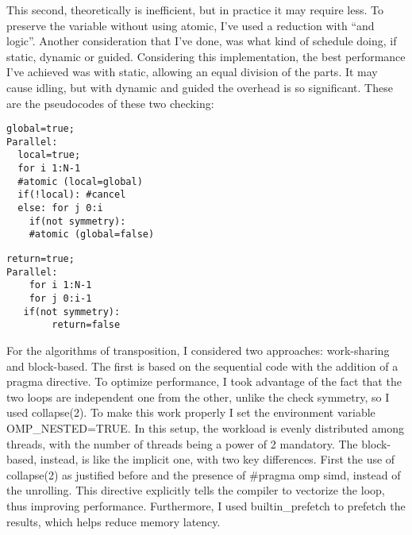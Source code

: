 This second, theoretically is inefficient, but in practice it may require less. To preserve the variable without using atomic, I've used a reduction with “and logic”. Another consideration that I've done, was what kind of schedule doing, if static, dynamic or guided. Considering this implementation, the best performance I've achieved was with static, allowing an equal division of the parts.
It may cause idling, but with dynamic and guided the overhead is so significant. These are the pseudocodes of these two checking:
\begin{minipage}[t]{0.5\columnwidth} 
\begin{lstlisting}[style=Cstyle, caption={Exit in Advance}]
global=true;
Parallel:
  local=true;
  for i 1:N-1
  #atomic (local=global)
  if(!local): #cancel
  else: for j 0:i
    if(not symmetry):
    #atomic (global=false)
\end{lstlisting}
\end{minipage}\hfill
\begin{minipage}[t]{0.5\columnwidth}
\begin{lstlisting}[style=Cstyle, caption={All iterations}]
return=true;
Parallel:
    for i 1:N-1
    for j 0:i-1
   if(not symmetry):
        return=false
\end{lstlisting}
\end{minipage}
For the algorithms of transposition, I considered two approaches: work-sharing and block-based. The first is based on the sequential code with the addition of a pragma directive. To optimize performance, I took advantage of the fact that the two loops are independent one from the other, unlike the check symmetry, so I used collapse(2). To make this work properly I set the environment variable OMP\_NESTED=TRUE. In this setup, the workload is evenly distributed among threads, with the number of threads being a power of 2 mandatory. The block-based, instead, is like the implicit one, with two key differences. First the use of collapse(2) as justified before and the presence of $\#$pragma omp simd, instead of the unrolling. This directive explicitly tells the compiler to vectorize the loop, thus improving performance. Furthermore, I used builtin\_prefetch to prefetch the results, which helps reduce memory latency.
